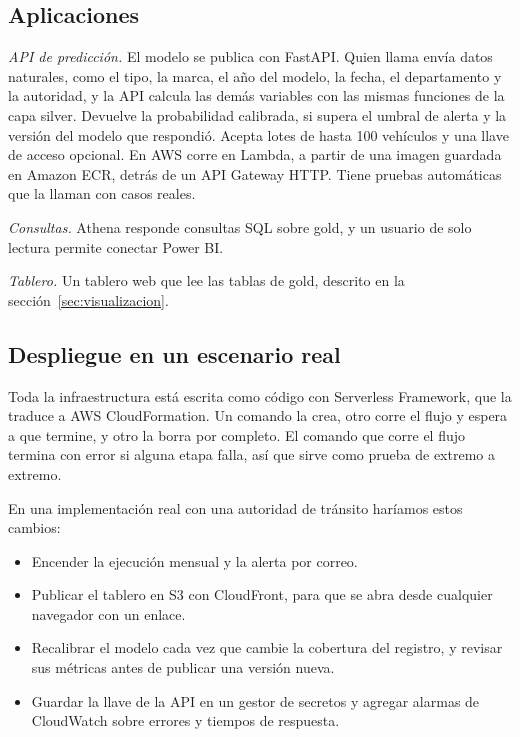\documentclass[11pt,a4paper]{article}
\begin{document}
\subsection{Aplicaciones}

\textit{API de predicción.} El modelo se publica con FastAPI. Quien llama envía datos naturales, como el tipo, la marca, el año del modelo, la fecha, el departamento y la autoridad, y la API calcula las demás variables con las mismas funciones de la capa silver. Devuelve la probabilidad calibrada, si supera el umbral de alerta y la versión del modelo que respondió. Acepta lotes de hasta 100 vehículos y una llave de acceso opcional. En AWS corre en Lambda, a partir de una imagen guardada en Amazon ECR, detrás de un API Gateway HTTP. Tiene pruebas automáticas que la llaman con casos reales.

\textit{Consultas.} Athena responde consultas SQL sobre gold, y un usuario de solo lectura permite conectar Power BI.

\textit{Tablero.} Un tablero web que lee las tablas de gold, descrito en la sección~\ref{sec:visualizacion}.

\subsection{Despliegue en un escenario real}

Toda la infraestructura está escrita como código con Serverless Framework, que la traduce a AWS CloudFormation. Un comando la crea, otro corre el flujo y espera a que termine, y otro la borra por completo. El comando que corre el flujo termina con error si alguna etapa falla, así que sirve como prueba de extremo a extremo.

En una implementación real con una autoridad de tránsito haríamos estos cambios:

\begin{itemize}
  \item Encender la ejecución mensual y la alerta por correo.
  \item Publicar el tablero en S3 con CloudFront, para que se abra desde cualquier navegador con un enlace.
  \item Recalibrar el modelo cada vez que cambie la cobertura del registro, y revisar sus métricas antes de publicar una versión nueva.
  \item Guardar la llave de la API en un gestor de secretos y agregar alarmas de CloudWatch sobre errores y tiempos de respuesta.
\end{itemize}
\end{document}
